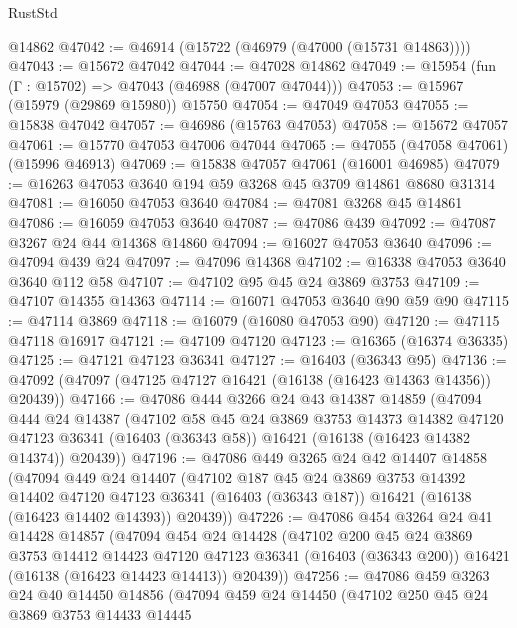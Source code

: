 \begin{lexlean}{RustStd}
\begin{coremodule}
    @14862
@47042 := @46914 (@15722 (@46979 (@47000 (@15731 @14863))))
@47043 := @15672 @47042
@47044 := @47028 @14862
@47049 := @15954 (fun (Γ : @15702) => @47043 (@46988 (@47007 @47044)))
@47053 := @15967 (@15979 (@29869 @15980)) @15750
@47054 := @47049 @47053
@47055 := @15838 @47042
@47057 := @46986 (@15763 @47053)
@47058 := @15672 @47057
@47061 := @15770 @47053 @47006 @47044
@47065 := @47055 (@47058 @47061) (@15996 @46913)
@47069 := @15838 @47057 @47061 (@16001 @46985)
@47079 := @16263 @47053 @3640 @194 @59 @3268 @45 @3709 @14861 @8680 @31314
@47081 := @16050 @47053 @3640
@47084 := @47081 @3268 @45 @14861
@47086 := @16059 @47053 @3640
@47087 := @47086 @439
@47092 := @47087 @3267 @24 @44 @14368 @14860
@47094 := @16027 @47053 @3640
@47096 := @47094 @439 @24
@47097 := @47096 @14368
@47102 := @16338 @47053 @3640 @3640 @112 @58
@47107 := @47102 @95 @45 @24 @3869 @3753
@47109 := @47107 @14355 @14363
@47114 := @16071 @47053 @3640 @90 @59 @90
@47115 := @47114 @3869
@47118 := @16079 (@16080 @47053 @90)
@47120 := @47115 @47118 @16917
@47121 := @47109 @47120
@47123 := @16365 (@16374 @36335)
@47125 := @47121 @47123 @36341
@47127 := @16403 (@36343 @95)
@47136 := @47092 (@47097 (@47125 @47127 @16421 (@16138 (@16423 @14363 @14356)) @20439))
@47166 := @47086
    @444
    @3266
    @24
    @43
    @14387
    @14859
    (@47094
      @444
      @24
      @14387
      (@47102
        @58
        @45
        @24
        @3869
        @3753
        @14373
        @14382
        @47120
        @47123
        @36341
        (@16403 (@36343 @58))
        @16421
        (@16138 (@16423 @14382 @14374))
        @20439))
@47196 := @47086
    @449
    @3265
    @24
    @42
    @14407
    @14858
    (@47094
      @449
      @24
      @14407
      (@47102
        @187
        @45
        @24
        @3869
        @3753
        @14392
        @14402
        @47120
        @47123
        @36341
        (@16403 (@36343 @187))
        @16421
        (@16138 (@16423 @14402 @14393))
        @20439))
@47226 := @47086
    @454
    @3264
    @24
    @41
    @14428
    @14857
    (@47094
      @454
      @24
      @14428
      (@47102
        @200
        @45
        @24
        @3869
        @3753
        @14412
        @14423
        @47120
        @47123
        @36341
        (@16403 (@36343 @200))
        @16421
        (@16138 (@16423 @14423 @14413))
        @20439))
@47256 := @47086
    @459
    @3263
    @24
    @40
    @14450
    @14856
    (@47094
      @459
      @24
      @14450
      (@47102
        @250
        @45
        @24
        @3869
        @3753
        @14433
        @14445

\end{coremodule}
\end{lexlean}
